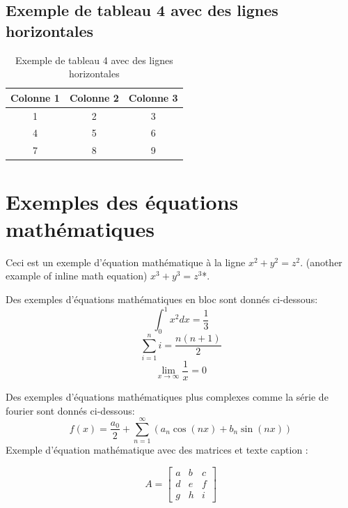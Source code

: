             \subsection{Exemple de tableau 4 avec des lignes horizontales}
            \begin{table}[!h]
                \centering
                \begin{tabular}{ccc}
                \hline
                \textbf{Colonne 1} & \textbf{Colonne 2} & \textbf{Colonne 3} \\ \hline 
                1 & 2 & 3 \\ 
                4 & 5 & 6 \\ 
                7 & 8 & 9 \\
                \hline
                \end{tabular}
                \caption{Exemple de tableau 4 avec des lignes horizontales}
                \end{table}




\section{Exemples des équations mathématiques}
Ceci est un exemple d'équation mathématique à la ligne $x^2 + y^2 = z^2$. (another example of inline math equation) $x^3 + y^3 = z^3$*.

Des exemples d'équations mathématiques en bloc sont donnés ci-dessous:
\begin{equation}
\int_{0}^{1} x^2 dx = \frac{1}{3}
\end{equation}
\begin{equation}
\sum_{i=1}^{n} i = \frac{n(n+1)}{2}
\end{equation}
\begin{equation}
\lim_{x \to \infty} \frac{1}{x} = 0
\end{equation}

Des exemples d'équations mathématiques plus complexes comme la série de fourier sont donnés ci-dessous:
\begin{equation}
f(x) = \frac{a_0}{2} + \sum_{n=1}^{\infty} (a_n \cos(nx) + b_n \sin(nx))
\end{equation}
Exemple d'équation mathématique avec des matrices et texte caption :\\
\begin{minipage}{\linewidth}
\begin{equation}
A = \begin{bmatrix}
a & b  & c\\
d & e & f\\
g & h & i
\end{bmatrix}
\end{equation}
\end{minipage}	
